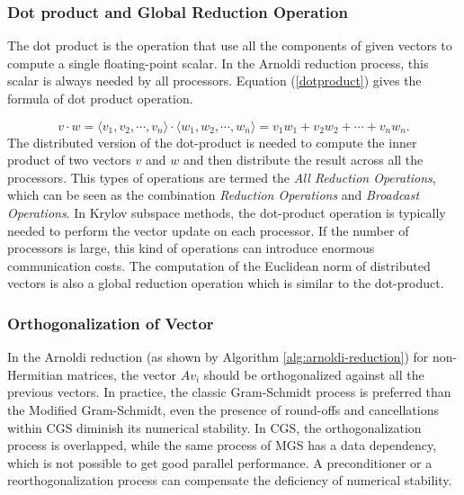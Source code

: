 \subsubsection{Dot product and Global Reduction Operation}

The dot product is the operation that use all the components of given vectors to compute a single floating-point scalar. In the Arnoldi reduction process, this scalar is always needed by all processors. Equation (\ref{dotproduct}) gives the formula of dot product operation.

\begin{equation}
\label{dotproduct}
v\cdot w = \langle v_1, v_2, \cdots, v_n \rangle \cdot\langle w_1, w_2, \cdots, w_n\rangle = v_1w_1+v_2w_2+\cdots+v_nw_n.
\end{equation}
The distributed version of the dot-product is needed to compute the inner product of two vectors $v$ and $w$ and then distribute the result across all the processors.  This types of operations are termed the \textit{All Reduction Operations}, which can be seen as the combination \textit{Reduction Operations} and \textit{Broadcast Operations}. In Krylov subspace methods, the dot-product operation is typically needed to perform the vector update on each processor. If the number of processors is large, this kind of operations can introduce enormous communication costs. The computation of the Euclidean norm of distributed vectors is also a global reduction operation which is similar to the dot-product.

\subsubsection{Orthogonalization of Vector}

In the Arnoldi reduction (as shown by Algorithm \ref{alg:arnoldi-reduction}) for non-Hermitian matrices, the vector $Av_i$ should be orthogonalized against all the previous vectors. In practice, the classic Gram-Schmidt process is preferred than the Modified Gram-Schmidt, even the presence of round-offs and cancellations within CGS diminish its numerical stability. In CGS, the orthogonalization process is overlapped, while the same process of MGS has a data dependency, which is not possible to get good parallel performance. A preconditioner or a reorthogonalization process can compensate the deficiency of numerical stability.

